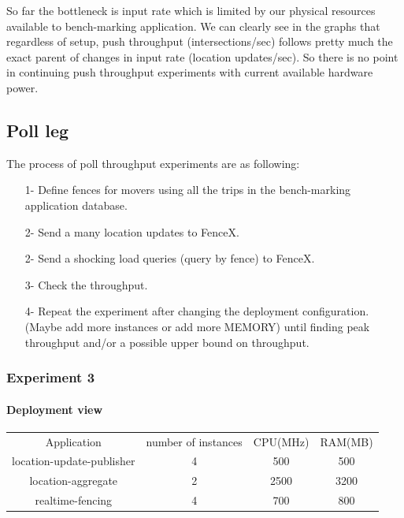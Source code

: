 \documentclass[a4]{report}
\begin{document}
    So far the bottleneck is input rate which is limited by our physical resources available to bench-marking
    application.
    We can clearly see in the graphs that regardless of setup, push throughput (intersections/sec) follows pretty
    much the exact parent of changes in input rate (location updates/sec).
    So there is no point in continuing push throughput experiments with current available hardware power.


    \subsection{Poll leg}
    The process of poll throughput experiments are as following:
    \begin{itemize}
        \item[1-] Define fences for movers using all the trips in the bench-marking application database.
        \item[2-] Send a many location updates to FenceX.
        \item[2-] Send a shocking load queries (query by fence) to FenceX.
        \item[3-] Check the throughput.
        \item[4-] Repeat the experiment after changing the deployment configuration. (Maybe add more instances or add
        more MEMORY) until finding peak throughput and/or a possible upper bound on throughput.
    \end{itemize}

    \subsubsection{Experiment 3}
    \paragraph{Deployment view}
    \begin{center}
        \begin{tabular}{ c c c c }
            Application               &  number of instances     & CPU(MHz)  & RAM(MB)    \\
            location-update-publisher &          4               & 500       &   500      \\
            location-aggregate        &          2               & 2500      &   3200     \\
            realtime-fencing          &          4               & 700       &   800      \\
        \end{tabular}
    \end{center}
\end{document}
